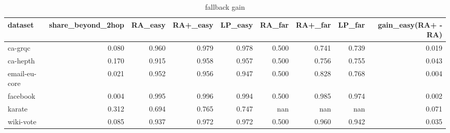 \begin{table}[t]
\centering
\caption{fallback gain}
\label{tab:fallback_gain}
\begin{tabular}{lrrrrrrrr}
\hline
dataset & share\_beyond\_2hop & RA\_easy & RA+\_easy & LP\_easy & RA\_far & RA+\_far & LP\_far & gain\_easy(RA+ - RA) \\
\hline
ca-grqc & 0.080 & 0.960 & 0.979 & 0.978 & 0.500 & 0.741 & 0.739 & 0.019 \\
ca-hepth & 0.170 & 0.915 & 0.958 & 0.957 & 0.500 & 0.756 & 0.755 & 0.043 \\
email-eu-core & 0.021 & 0.952 & 0.956 & 0.947 & 0.500 & 0.828 & 0.768 & 0.004 \\
facebook & 0.004 & 0.995 & 0.996 & 0.994 & 0.500 & 0.985 & 0.974 & 0.002 \\
karate & 0.312 & 0.694 & 0.765 & 0.747 & nan & nan & nan & 0.071 \\
wiki-vote & 0.085 & 0.937 & 0.972 & 0.972 & 0.500 & 0.960 & 0.942 & 0.035 \\
\hline
\end{tabular}
\end{table}